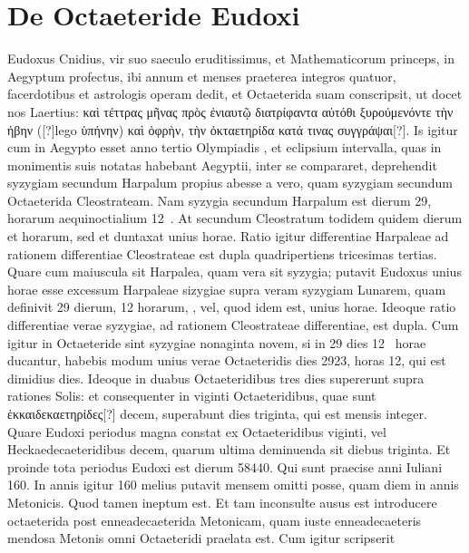 \section{De Octaeteride Eudoxi}
%
Eudoxus Cnidius, vir suo saeculo eruditissimus, et Mathematicorum
princeps, in Aegyptum profectus, ibi annum et menses
praeterea integros quatuor, facerdotibus et astrologis operam dedit,
et Octaeterida suam conscripsit, ut docet nos Laertius:
 \textgreek{καὶ τέττρας
μῆνας πρὸς ἐνιαυτῷ διατρίφαντα αὐτόθι ξυρούμενόντε τὴν ἡβην ([?]}lego
 \textgreek{ὑπήνην) καὶ ὀφρὴν, τὴν ὀκταετηρίδα κατά τινας συγγράψαι[?]}.
Is igitur cum in Aegypto
esset anno tertio Olympiadis , et eclipsium intervalla, quas in
monimentis suis notatas habebant Aegyptii, inter se compararet, deprehendit
syzygiam secundum Harpalum propius abesse a vero, quam
syzygiam secundum Octaeterida Cleostrateam.
Nam syzygia secundum
Harpalum est dierum 29, horarum aequinoctialium 12~.
At
secundum Cleostratum todidem quidem dierum et horarum, sed et 
duntaxat unius horae.
Ratio igitur differentiae Harpaleae ad rationem
differentiae Cleostrateae est dupla quadripertiens tricesimas tertias.
Quare cum maiuscula sit Harpalea, quam vera sit syzygia;
 putavit Eudoxus
 unius horae esse excessum Harpaleae sizygiae
 supra veram syzygiam
Lunarem, quam definivit 29 dierum, 12 horarum, , vel, quod
idem est,  unius horae.
Ideoque ratio differentiae verae syzygiae, ad rationem
Cleostrateae differentiae, est dupla.
Cum igitur in Octaeteride
sint syzygiae nonaginta novem, si in 29 dies 12~
 horae ducantur, habebis
modum unius verae Octaeteridis dies 2923, horas 12, qui est dimidius
dies.
Ideoque in duabus Octaeteridibus tres dies supererunt supra
rationes Solis: et consequenter in viginti Octaeteridibus, quae sunt
\textgreek{ἑκκαιδεκαετηρίδες[?]} decem, superabunt dies triginta,
 qui est mensis integer.
Quare Eudoxi periodus magna constat ex Octaeteridibus viginti,
vel Heckaedecaeteridibus decem, quarum ultima deminuenda sit
diebus triginta.
Et proinde tota periodus Eudoxi est dierum 58440.
Qui sunt praecise anni Iuliani 160.
In annis igitur 160 melius putavit
mensem omitti posse, quam diem in  annis Metonicis.
Quod tamen
ineptum est.
Et tam inconsulte ausus est introducere octaeterida
post enneadecaeterida Metonicam, quam iuste enneadecaeteris mendosa
Metonis omni Octaeteridi praelata est.
Cum igitur scripserit
